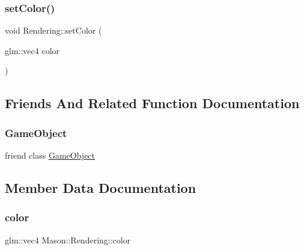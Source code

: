 \hypertarget{class_mason_1_1_rendering_aa8a7db1f0f25ac88cc6584a2a5b814ed}{}\label{class_mason_1_1_rendering_aa8a7db1f0f25ac88cc6584a2a5b814ed} 
\subsubsection{\texorpdfstring{set\+Color()}{setColor()}}
{\footnotesize\ttfamily void Rendering\+::set\+Color (\begin{DoxyParamCaption}\item[{glm\+::vec4}]{color }\end{DoxyParamCaption})}



\subsection{Friends And Related Function Documentation}
\hypertarget{class_mason_1_1_rendering_a00df87c957d8f7ee0fc51f07a0542f4a}{}\label{class_mason_1_1_rendering_a00df87c957d8f7ee0fc51f07a0542f4a} 
\subsubsection{\texorpdfstring{Game\+Object}{GameObject}}
{\footnotesize\ttfamily friend class \hyperlink{class_mason_1_1_game_object}{Game\+Object}\hspace{0.3cm}{\ttfamily [friend]}}



\subsection{Member Data Documentation}
\hypertarget{class_mason_1_1_rendering_a5a78c6260d5111659f1e96888a55bda1}{}\label{class_mason_1_1_rendering_a5a78c6260d5111659f1e96888a55bda1} 
\subsubsection{\texorpdfstring{color}{color}}
{\footnotesize\ttfamily glm\+::vec4 Mason\+::\+Rendering\+::color\hspace{0.3cm}{\ttfamily [protected]}}

